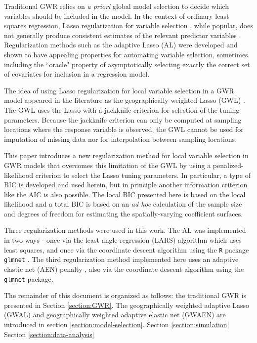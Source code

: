 \documentclass[authoryear, review, 11pt]{elsarticle}
\begin{document}
	Traditional GWR relies on \emph{a priori} global model selection to decide which variables should be included in the model. In the context of ordinary least squares regression, Lasso regularization for variable selection \citep{Tibshirani:1996}, while popular, does not generally produce consistent estimates of the relevant predictor variables \citep{Leng-2006}. Regularization methods such as the adaptive Lasso (AL) \citep{Zou:2006} were developed and shown to have appealing properties for automating variable selection, sometimes including the ``oracle" property of asymptotically selecting exactly the correct set of covariates for inclusion in a regression model.
	
	The idea of using Lasso regularization for local variable selection in a GWR model appeared in the literature as the geographically weighted Lasso (GWL) \citep{Wheeler:2009}. The GWL uses the Lasso with a jackknife criterion for selection of the tuning parameters. Because the jackknife criterion can only be computed at sampling locations where the response variable is observed, the GWL cannot be used for imputation of missing data nor for interpolation between sampling locations.
	
	This paper introduces a new regularization method for local variable selection in GWR models that overcomes this limitation of the GWL by using a penalized-likelihood criterion to select the Lasso tuning parameters. In particular, a type of BIC is developed and used herein, but in principle another information criterion like the AIC is also possible. The local BIC presented here is based on the local likelihood \citep{Loader:1999} and a total BIC is based on an \emph{ad hoc} calculation of the sample size and degrees of freedom for estimating the spatially-varying coefficient surfaces.
	
	Three regularization methods were used in this work. The AL was implemented in two ways - once via the least angle regression (LARS) algorithm \citep{Efron:2004b} which uses least squares, and once via the coordinate descent algorithm using the {\tt R} package {\tt glmnet} \citep{Friedman:2010}. The third regularization method implemented here uses an adaptive elastic net (AEN) penalty \citep{Zou:2009}, also via the coordinate descent algorithm using the {\tt glmnet} package.
	
	The remainder of this document is organized as follows: the traditional GWR is presented in Section \ref{section:GWR}. The geographically weighted adaptive Lasso (GWAL) and geographically weighted adaptive elastic net (GWAEN) are introduced in section \ref{section:model-selection}. Section \ref{section:simulation} Section \ref{section:data-analysis}
\end{document}

